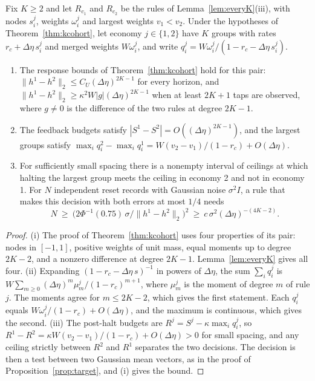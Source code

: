 \begin{proposition}\label{prop:targetK}
Fix $K\ge2$ and let $R_{c_1}$ and $R_{c_2}$ be the rules of Lemma~\ref{lem:everyK}(iii), with nodes $s^j_i$, weights $\omega^j_i$ and largest weights $v_1<v_2$. Under the hypotheses of Theorem~\ref{thm:kcohort}, let economy $j\in\{1,2\}$ have $K$ groups with rates $r_c+\Delta\eta\,s^j_i$ and merged weights $W\omega^j_i$, and write $q^j_i=W\omega^j_i/(1-r_c-\Delta\eta\,s^j_i)$.
\begin{enumerate}[label=(\roman*),itemsep=1pt]
\item The response bounds of Theorem~\ref{thm:kcohort} hold for this pair: $\|h^1-h^2\|_2\le C_U(\Delta\eta)^{2K-1}$ for every horizon, and $\|h^1-h^2\|_2\ge\kappa^2W|g|(\Delta\eta)^{2K-1}$ when at least $2K+1$ taps are observed, where $g\ne0$ is the difference of the two rules at degree $2K-1$.
\item The feedback budgets satisfy $|S^1-S^2|=O((\Delta\eta)^{2K-1})$, and the largest groups satisfy $\max_iq^2_i-\max_iq^1_i=W(v_2-v_1)/(1-r_c)+O(\Delta\eta)$.
\item For sufficiently small spacing there is a nonempty interval of ceilings at which halting the largest group meets the ceiling in economy 2 and not in economy 1. For $N$ independent reset records with Gaussian noise $\sigma^2I$, a rule that makes this decision with both errors at most $1/4$ needs
\[
N\ \ge\ \bigl(2\Phi^{-1}(0.75)\,\sigma/\|h^1-h^2\|_2\bigr)^2\ \ge\ c\,\sigma^2(\Delta\eta)^{-(4K-2)} .
\]
\end{enumerate}
\end{proposition}

\begin{proof}
(i) The proof of Theorem~\ref{thm:kcohort} uses four properties of its pair: nodes in $[-1,1]$, positive weights of unit mass, equal moments up to degree $2K-2$, and a nonzero difference at degree $2K-1$. Lemma~\ref{lem:everyK} gives all four. (ii) Expanding $(1-r_c-\Delta\eta\,s)^{-1}$ in powers of $\Delta\eta$, the sum $\sum_iq^j_i$ is $W\sum_{m\ge0}(\Delta\eta)^m\mu^j_m/(1-r_c)^{m+1}$, where $\mu^j_m$ is the moment of degree $m$ of rule $j$. The moments agree for $m\le2K-2$, which gives the first statement. Each $q^j_i$ equals $W\omega^j_i/(1-r_c)+O(\Delta\eta)$, and the maximum is continuous, which gives the second. (iii) The post-halt budgets are $R^j=S^j-\kappa\max_iq^j_i$, so $R^1-R^2=\kappa W(v_2-v_1)/(1-r_c)+O(\Delta\eta)>0$ for small spacing, and any ceiling strictly between $R^2$ and $R^1$ separates the two decisions. The decision is then a test between two Gaussian mean vectors, as in the proof of Proposition~\ref{prop:target}, and (i) gives the bound.
\end{proof}

